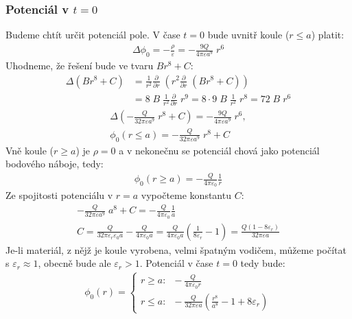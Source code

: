 \documentclass[10pt,a4paper]{article}
\newcommand{\pd}[2]{\frac{\partial  #1}{\partial  #2} \;}
\newcommand{\mathalt}[2]{
    \texorpdfstring{#2}{#1}
}
\begin{document}
\subsubsection*{Potenciál v \mathalt{t=0}{$t=0$}}
Budeme chtít určit potenciál pole. V čase $t=0$ bude uvnitř koule ($r \leq a$) platit:
\begin{gather*}
    \Delta \phi_0 = -\frac{\rho}{\varepsilon} = -\frac{9Q}{4\pi\varepsilon a^9} \; r^6
\end{gather*}
Uhodneme, že řešení bude ve tvaru $Br^8 + C$:
\begin{align*}
    \Delta (Br^8 + C)
    &= \frac{1}{r^2} \pd{}{r} \left( r^2 \pd{}{r} (Br^8 + C) \right) \\[5pt]
    &= 8 \; B \; \frac{1}{r^2} \pd{}{r} r^9
    = 8 \cdot 9 \; B \; \frac{1}{r^2} \; r^8
    = 72 \; B \; r^6
\end{align*}
\begin{gather*}
    \Delta \left( -\frac{Q}{32\pi\varepsilon a^9} \; r^8 + C \right)
    = -\frac{9Q}{4\pi\varepsilon a^9} \; r^6,
    \\[15pt]
    \phi_0(r \leq a) = -\frac{Q}{32\pi \varepsilon a^9} \; r^8 + C
\end{gather*}
Vně koule ($r \geq a$) je $\rho=0$ a v nekonečnu se potenciál chová jako potenciál bodového náboje, tedy:
\begin{gather*}
    \phi_0(r \geq a) = -\frac{Q}{4\pi\varepsilon_0} \frac{1}{r}
\end{gather*}
Ze spojitosti potenciálu v $r=a$ vypočteme konstantu $C$:
\begin{gather*}
    -\frac{Q}{32\pi \varepsilon a^9} \; a^8 + C
    = -\frac{Q}{4\pi\varepsilon_0} \frac{1}{a}
    \\[5pt]
    C = \frac{Q}{32\pi \varepsilon_r \varepsilon_0 a} -\frac{Q}{4\pi\varepsilon_0 a}
    = \frac{Q}{4\pi\varepsilon_0 a} \left( \frac{1}{8\varepsilon_r} - 1 \right)
    = \frac{Q (1-8\varepsilon_r)}{32\pi\varepsilon a}
\end{gather*}
Je-li materiál, z nějž je koule vyrobena, velmi špatným vodičem, můžeme počítat s $\varepsilon_r \approx 1$, obecně bude ale $\varepsilon_r > 1$.
Potenciál v čase $t=0$ tedy bude:
\begin{gather*}
    \phi_0(r) = \begin{cases}
        r \geq a: \;\; -\frac{Q}{4\pi\varepsilon_0 r} \\
        r \leq a: \;\; -\frac{Q}{32\pi\varepsilon a} \left(\frac{r^8}{a^8} - 1 + 8\varepsilon_r\right)
    \end{cases}
\end{gather*}
\end{document}
